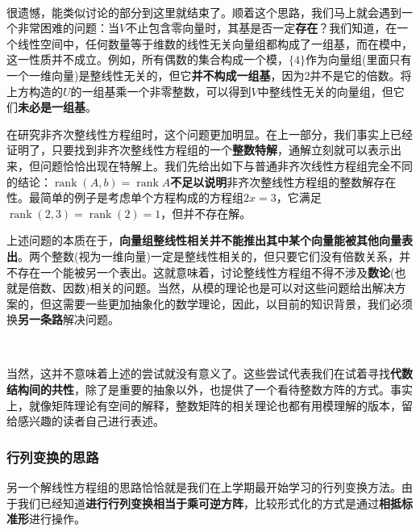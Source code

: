 \documentclass[a4paper,UTF8,fontset=windows,AutoFakeBold]{ctexart}
\DeclareMathOperator{\rank}{rank}
\newcommand*{\note}{\noindent *}
\begin{document}
\

很遗憾，能类似讨论的部分到这里就结束了。顺着这个思路，我们马上就会遇到一个非常困难的问题：当$V$不止包含零向量时，其基是否一定\textbf{存在}？我们知道，在一个线性空间中，任何数量等于维数的线性无关向量组都构成了一组基，而在模中，这一性质并不成立。例如，所有偶数的集合构成一个模，$\{4\}$作为向量组(里面只有一个一维向量)是整线性无关的，但它\textbf{并不构成一组基}，因为2并不是它的倍数。将上方构造的$U$的一组基乘一个非零整数，可以得到$V$中整线性无关的向量组，但它们\textbf{未必是一组基}。

在研究非齐次整线性方程组时，这个问题更加明显。在上一部分，我们事实上已经证明了，只要找到非齐次整线性方程组的一个\textbf{整数特解}，通解立刻就可以表示出来，但问题恰恰出现在特解上。我们先给出如下与普通非齐次线性方程组完全不同的结论：$\rank(A,b)=\rank A$\textbf{不足以说明}非齐次整线性方程组的整数解存在性。最简单的例子是考虑单个方程构成的方程组$2x=3$，它满足$\rank(2,3)=\rank(2)=1$，但并不存在解。

上述问题的本质在于，\textbf{向量组整线性相关并不能推出其中某个向量能被其他向量表出}。两个整数(视为一维向量)一定是整线性相关的，但只要它们没有倍数关系，并不存在一个能被另一个表出。这就意味着，讨论整线性方程组不得不涉及\textbf{数论}(也就是倍数、因数)相关的问题。当然，从模的理论也是可以对这些问题给出解决方案的，但这需要一些更加抽象化的数学理论，因此，以目前的知识背景，我们必须换\textbf{另一条路}解决问题。

\

\note 当然，这并不意味着上述的尝试就没有意义了。这些尝试代表我们在试着寻找\textbf{代数结构间的共性}，除了是重要的抽象以外，也提供了一个看待整数方阵的方式。事实上，就像矩阵理论有空间的解释，整数矩阵的相关理论也都有用模理解的版本，留给感兴趣的读者自己进行表述。

\subsubsection{行列变换的思路}
另一个解线性方程组的思路恰恰就是我们在上学期最开始学习的行列变换方法。由于我们已经知道\textbf{进行行列变换相当于乘可逆方阵}，比较形式化的方式是通过\textbf{相抵标准形}进行操作。
\end{document}
